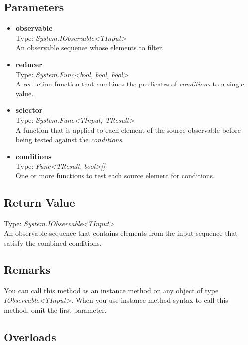 \documentclass[12pt,a4paper,twoside]{report}
\begin{document}
\subsection{Parameters}
\begin{itemize}
    \item \textbf{observable}\\
        Type: \textit{System.IObservable<TInput>}\\
        An observable sequence whose elements to filter.
    \item \textbf{reducer} \\
        Type: \textit{System.Func<bool, bool, bool>} \\
        A reduction function that combines the predicates of \textit{conditions} to a single value.
    \item \textbf{selector} \\
        Type: \textit{System.Func<TInput, TResult>}\\
        A function that is applied to each element of the source observable before being tested against the \textit{conditions}.
    \item \textbf{conditions} \\
        Type: \textit{Func<TResult, bool>[]} \\
        One or more functions to test each source element for conditions.
\end{itemize}

\subsection{Return Value}
Type: \textit{System.IObservable<TInput>}\\
An observable sequence that contains elements from the input sequence that satisfy the combined conditions.

\subsection{Remarks}
You can call this method as an instance method on any object of type \textit{IObservable<TInput>}. When you use 
instance method syntax to call this method, omit the first parameter.

\subsection{Overloads}
\end{document}
